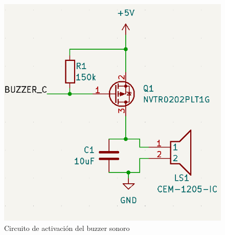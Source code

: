 \begin{figure}[H]
    \centering
    \includegraphics[width = 0.6 \linewidth]{img/buzzer.png}
    \caption{Circuito de activación del buzzer sonoro}
    \label{fig:buzzer_sch}
\end{figure}    


